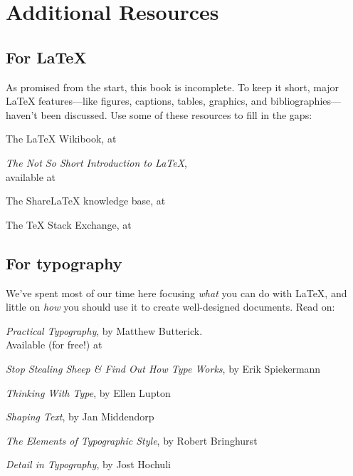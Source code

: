 \setlength\parskip{0.55\baselineskip}
\setlength\parindent{0pt}

\chapter{Additional Resources}
\label{resources}

\section{For \texorpdfstring{\LaTeX}{LaTeX}}

As promised from the start, this book is incomplete.
To keep it short,
major \LaTeX{} features---like figures, captions, tables, graphics,
and bibliographies---haven't been discussed.
Use some of these resources to fill in the gaps:
\begin{leftfigure}
The \LaTeX{} Wikibook, at 

\textit{The Not So Short Introduction to \LaTeX}, \\
available at 

The Share\LaTeX{} knowledge base, at 

The \TeX{} Stack Exchange, at 
\end{leftfigure}

\section{For typography}

We've spent most of our time here focusing \emph{what} you can do with \LaTeX,
and little on \emph{how} you should use it to create well-designed documents.
Read on:
\begin{leftfigure}
\textit{Practical Typography}, by Matthew Butterick. \\
Available (for free!) at 

\textit{Stop Stealing Sheep \& Find Out How Type Works}, by Erik Spiekermann

\textit{Thinking With Type}, by Ellen Lupton

\textit{Shaping Text}, by Jan Middendorp

\textit{The Elements of Typographic Style}, by Robert Bringhurst

\textit{Detail in Typography}, by Jost Hochuli
\end{leftfigure}

